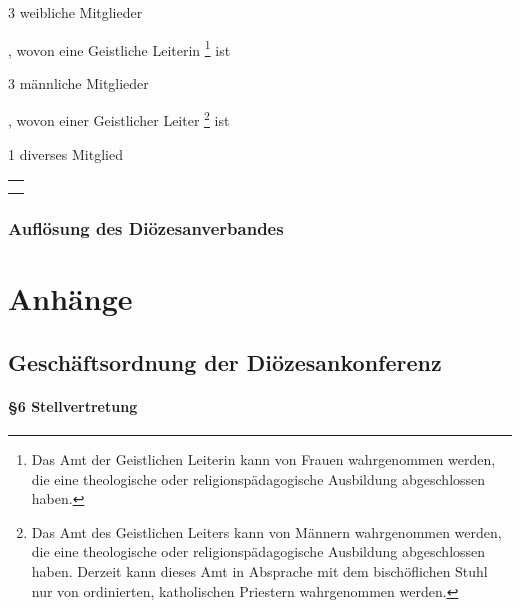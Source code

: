 \documentclass[12pt]{report}
\begin{document}
\begin{flushleft}
\begin{itemize}
  {\color{red}\item 3 weibliche Mitglieder}, wovon eine Geistliche Leiterin 
       \footnote{
           Das Amt der Geistlichen Leiterin kann von Frauen wahrgenommen werden, die eine theologische
           oder religionspädagogische Ausbildung abgeschlossen haben.
       }
       ist
  {\color{red}\item 3 männliche Mitglieder}, wovon einer Geistlicher Leiter
        \footnote{
            Das Amt des Geistlichen Leiters kann von Männern wahrgenommen werden, die eine theologische
            oder religionspädagogische Ausbildung abgeschlossen haben. Derzeit kann dieses Amt in Absprache
            mit dem bischöflichen Stuhl nur von ordinierten, katholischen Priestern wahrgenommen werden.	
        }
        ist
    {\color{red}\item 1 diverses Mitglied}
\end{itemize}

\begin{table}[H]
 \begin{tabular}{|l|}
  \hline
  \rowcolor[HTML]{9AFF99} 
  \rule[-1ex]{0pt}{4ex}
  \begin{minipage}[t]{\textwidth}
   \textbf{Ende\\}  
    \end{minipage}
  \\ \hline
 \end{tabular}
\end{table}

\section{Auflösung des Diözesanverbandes}

\part*{Anhänge}

\chapter*{Geschäftsordnung der Diözesankonferenz}

\subsection*{§6 Stellvertretung}


\end{flushleft}
\end{document}
